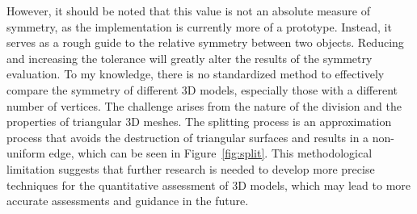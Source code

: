 However, it should be noted that this value is not an absolute measure of symmetry, as the implementation is currently more of a prototype. Instead, it serves as a rough guide to the relative symmetry between two objects. Reducing and increasing the tolerance will greatly alter the results of the symmetry evaluation. To my knowledge, there is no standardized method to effectively compare the symmetry of different 3D models, especially those with a different number of vertices. The challenge arises from the nature of the division and the properties of triangular 3D meshes. The splitting process is an approximation process that avoids the destruction of triangular surfaces and results in a non-uniform edge, which can be seen in Figure~\ref{fig:split}. This methodological limitation suggests that further research is needed to develop more precise techniques for the quantitative assessment of 3D models, which may lead to more accurate assessments and guidance in the future.

